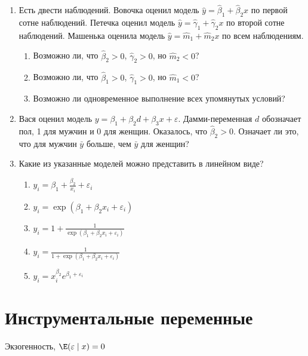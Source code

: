 \documentclass[pdftex,12pt,a4paper]{article}
\def \hb{\hat{\beta}}
\def \hy{\hat{y}}
\def \e{\varepsilon}
\newcommand{\solution}[1]{}
\begin{document}
\begin{enumerate}
\item Есть двести наблюдений. Вовочка оценил модель $\hy=\hb_1+\hb_2 x$ по первой сотне наблюдений. Петечка оценил модель $\hy=\hat{\gamma}_1+\hat{\gamma}_2 x$ по второй сотне наблюдений. Машенька оценила модель $\hy=\hat{m}_1+\hat{m}_2 x$ по всем наблюдениям.
\begin{enumerate}
\item Возможно ли, что $\hb_2>0$, $\hat{\gamma}_2>0$, но $\hat{m}_2<0$?
\item Возможно ли, что $\hb_1>0$, $\hat{\gamma}_1>0$, но $\hat{m}_1<0$?
\item Возможно ли одновременное выполнение всех упомянутых условий?
\end{enumerate}
\solution{да, возможно. Два вытянутых облачка точек. Первое облачко даёт первую регрессию, второе --- вторую. Прямая, соединяющая центры облачков, --- общую.}



\item Вася оценил модель $y=\beta_1+\beta_2 d+\beta_3 x+\varepsilon$. Дамми-переменная $d$ обозначает пол, 1 для мужчин и 0 для женщин. Оказалось, что $\hat{\beta}_2>0$. Означает ли это, что для мужчин $\bar{y}$ больше, чем $\bar{y}$ для женщин?
\solution{Нет. Коэффициенты можно интепретировать только <<при прочих равных>>, т.е. при равных $x$. Из-за разных $x$ может оказаться, что у мужчин $\bar{y}$ меньше, чем $\bar{y}$ для женщин.}


\item Какие из указанные моделей можно представить в линейном виде?
\begin{enumerate}
\item $y_i=\beta_1+\frac{\beta_2}{x_i}+\e_i$
\item $y_i=\exp(\beta_1+\beta_2 x_i+\e_i)$
\item $y_i=1+\frac{1}{\exp(\beta_1+\beta_2 x_i+\e_i)}$
\item $y_i=\frac{1}{1+\exp(\beta_1+\beta_2 x_i+\e_i)}$
\item $y_i=x_i^{\beta_2}e^{\beta_1+\e_i}$
\end{enumerate}
\solution{}

\end{enumerate}

\section{Инструментальные переменные}


Экзогенность, $\E(\e\mid x)=0$
\end{document}

